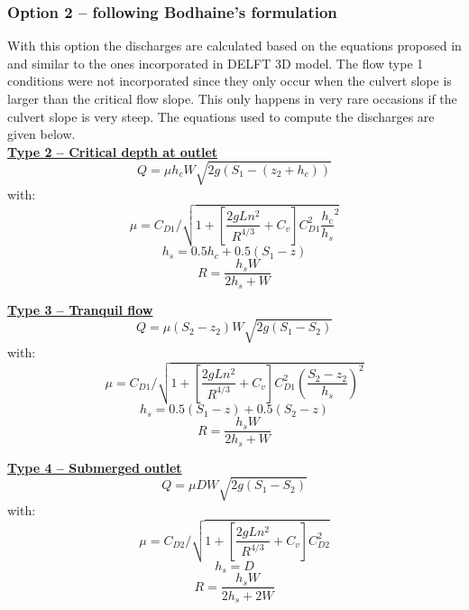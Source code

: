 \subsubsection{Option 2 -- following Bodhaine's formulation}

With this option the discharges are calculated based on the equations proposed in \cite{Bodhaine1968}
and similar to the ones incorporated in DELFT 3D model.
The flow type 1 conditions were not incorporated since they only
occur when the culvert slope is larger than the critical flow slope.
This only happens in very rare occasions if the culvert slope is very steep.
The equations used to compute the discharges are given below.\\

\underline{\textbf{Type 2 -- Critical depth at outlet}}\\
\begin{equation}
Q = \mu h_c W \sqrt{2g(S_1-(z_2+h_c))}
\end{equation}
with:
\begin{equation}
\mu = C_{D1}/\sqrt{1+\left[\dfrac{2gLn^2}{R^{4/3}} +C_v\right] C_{D1}^2 \dfrac{h_c}{h_s}^2}
\end{equation}
\begin{equation}
h_s=0.5h_c+0.5(S_1-z)
\end{equation}
\begin{equation}
R=\dfrac{h_s W}{2h_s+W}
\end{equation}

\underline{\textbf{Type 3 -- Tranquil flow}}\\
\begin{equation}
Q=\mu (S_2-z_2)W\sqrt{2g(S_1-S_2 )}
\end{equation}
with:
\begin{equation}
\mu = C_{D1}/\sqrt{ 1+\left[\dfrac{2gLn^2}{R^{4/3}} +C_v \right] C_{D1}^2 \left(\dfrac{S_2-z_2}{h_s}\right)^2}
\end{equation}
\begin{equation}
h_s=0.5(S_1-z)+0.5(S_2-z)
\end{equation}
\begin{equation}
  R=\dfrac{h_sW}{2h_s+W}
\end{equation}

\underline{\textbf{Type 4 -- Submerged outlet}}\\
\begin{equation}
Q =\mu D W \sqrt{2g(S_1-S_2)}
\end{equation}
with:
\begin{equation}
\mu = C_{D2}/\sqrt{1+\left[\dfrac{2gLn^2}{R^{4/3}} +C_v \right] C_{D2}^2}
\end{equation}
\begin{equation}
h_s=D
\end{equation}
\begin{equation}
R=\dfrac{h_s W}{2h_s+2W}
\end{equation}

